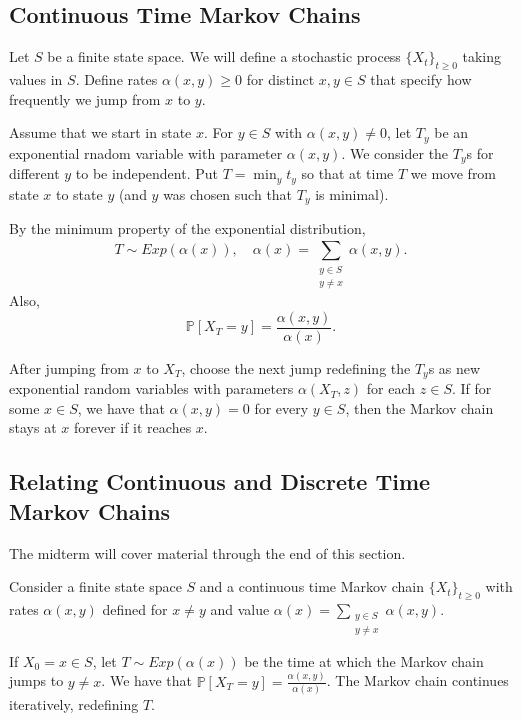 \documentclass{tufte-handout}
\renewcommand*\P{\mathbb{P}}
\theoremstyle{definition}
\begin{document}
\subsection{Continuous Time Markov Chains}

Let $S$ be a finite state space. We will define a stochastic process $\{X_t\}_{t\ge 0}$ taking values in $S$. Define rates $\alpha(x,y) \ge 0$ for distinct $x,y \in S$ that specify how frequently we jump from $x$ to $y$. 

Assume that we start in state $x$. For $y \in S$ with $\alpha(x,y) \ne 0$, let $T_y$ be an exponential rnadom variable with parameter $\alpha(x,y)$. We consider the $T_y$s for different $y$ to be independent. Put $T = \min_y t_y$ so that at time $T$ we move from state $x$ to state $y$ (and $y$ was chosen such that $T_y$ is minimal). 

By the minimum property of the exponential distribution, \[
	T \sim Exp(\alpha(x)), \quad \alpha(x) = \sum\limits_{\substack{y \in S \\ y \ne x}}^{} \alpha(x,y)
.\] Also, \[
	\P\left[X_T = y\right] = \frac{\alpha(x,y)}{\alpha(x)}
.\]

After jumping from $x$ to $X_T$, choose the next jump redefining the $T_y$s as new exponential random variables with parameters $\alpha(X_T, z)$ for each $z \in S$. If for some $x \in S$, we have that $\alpha(x,y) = 0$ for every $y \in S$, then the Markov chain stays at $x$ forever if it reaches $x$.

\subsection{Relating Continuous and Discrete Time Markov Chains}

The midterm will cover material through the end of this section.

Consider a finite state space $S$ and a continuous time Markov chain $\{X_t\}_{t\ge 0}$ with rates $\alpha(x,y)$ defined for $x\ne y$ and value $\alpha(x) = \sum\limits_{\substack{y \in S \\ y \ne x}}^{} \alpha(x,y)$.

If $X_0 = x \in S$, let $T \sim Exp(\alpha(x))$ be the time at which the Markov chain jumps to $y \ne x$. We have that $\P\left[X_T = y\right] = \frac{\alpha(x,y)}{\alpha(x)}$. The Markov chain continues iteratively, redefining $T$. 
\end{document}
